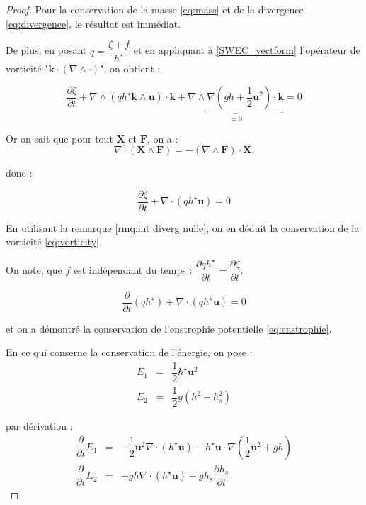 \begin{proof}
Pour la conservation de la masse \eqref{eq:mass} et de la divergence \eqref{eq:divergence}, le résultat est immédiat.

De plus, en posant $q = \dfrac{\zeta+f}{h^{\star}}$ et en appliquant à \eqref{SWEC_vectform} l'opérateur de vorticité "$\mathbf{k} \cdot \left( \nabla \wedge \cdot \right)$", on obtient :

$$
\dfrac{\partial \zeta}{\partial t}+\nabla \wedge \left( q h^{\star} \mathbf{k} \wedge \mathbf{u} \right) \cdot\mathbf{k} + \underbrace{\nabla \wedge \nabla \left( gh + \dfrac{1}{2}\mathbf{u}^2 \right) \cdot \mathbf{k}}_{=0} = 0 
$$

Or on sait que pour tout $\mathbf{X}$ et $\mathbf{F}$, on a :
\begin{equation}
\nabla \cdot \left( \mathbf{X} \wedge \mathbf{F} \right) = - \left( \nabla \wedge \mathbf{F} \right) \cdot \mathbf{X}.
\end{equation}

donc :

$$
\dfrac{ \partial \zeta}{\partial t} + \nabla \cdot \left( q h^{\star} \mathbf{u} \right) = 0
$$

En utilisant la remarque \ref{rmq:int diverg nulle}, on en déduit la conservation de la vorticité \eqref{eq:vorticity}.

On note, que $f$ est indépendant du temps : $\dfrac{\partial q h^{\star}}{\partial t
} = \dfrac{\partial \zeta}{\partial t}$.

$$
\dfrac{\partial}{\partial t} \left( q h^{\star} \right) + \nabla \cdot \left( q h^{\star} \mathbf{u} \right) = 0
$$

et on a démontré la conservation de l'enstrophie potentielle \eqref{eq:enstrophie}.

En ce qui conserne la conservation de l'énergie, on pose :
\begin{equation}
\begin{array}{rcl}
E_1 & = & \dfrac{1}{2} h^{\star} \mathbf{u}^2 \\
E_2 & = & \dfrac{1}{2} g \left( h^2 - h_s^2 \right)
\end{array}
\end{equation}

par dérivation :
\begin{equation}
\begin{array}{rcl}
\dfrac{\partial}{\partial t} E_1 & = & -\dfrac{1}{2} \mathbf{u}^2 \nabla \cdot \left( h^{\star} \mathbf{u} \right) - h^{\star} \mathbf{u} \cdot \nabla \left( \dfrac{1}{2} \mathbf{u}^2 + gh \right) \\
\dfrac{\partial}{\partial t} E_2 & = & - gh \nabla \cdot \left( h^{\star} \mathbf{u} \right) - g h_s \dfrac{\partial h_s}{\partial t} 
\end{array}
\end{equation}


\end{proof}
